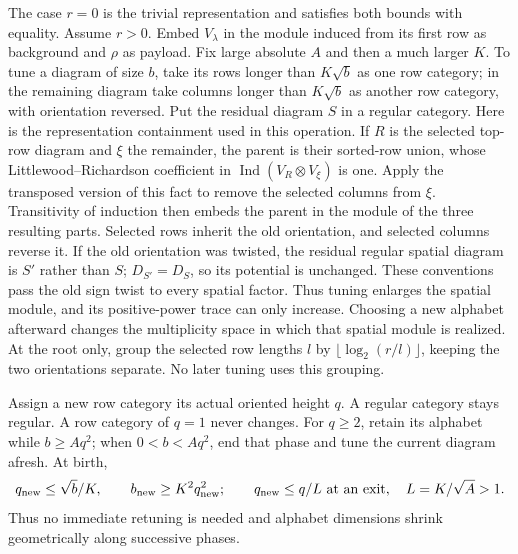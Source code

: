 The case $r=0$ is the trivial representation and satisfies both bounds
with equality.  Assume $r>0$.  Embed $V_\lambda$ in the module induced from its first row as
background and $\rho$ as payload.  Fix large absolute $A$ and then
a much larger $K$.  To tune a diagram of size $b$, take its rows
longer than $K\sqrt b$ as one row category; in the remaining diagram
take columns longer than $K\sqrt b$ as another row category, with
orientation reversed.  Put the residual diagram $S$ in a regular category.  Here is
the representation containment used in this operation.  If $R$ is the
selected top-row diagram and $\xi$ the remainder, the parent is their
sorted-row union, whose Littlewood--Richardson coefficient in
$\operatorname{Ind}(V_R\otimes V_\xi)$ is one.  Apply the transposed
version of this fact to remove the selected columns from $\xi$.
Transitivity of induction then embeds the parent in the module of
the three resulting parts.  Selected rows inherit the old orientation,
and selected columns reverse it.  If the old orientation was twisted,
the residual regular spatial diagram is $S'$ rather than $S$;
$D_{S'}=D_S$, so its potential is unchanged.  These conventions pass
the old sign twist to every spatial factor.  Thus tuning enlarges the
spatial module, and its positive-power trace can only increase.
Choosing a new alphabet afterward changes the multiplicity space in
which that spatial module is realized.
At the root only, group the selected row lengths $l$ by
$\lfloor\log_2(r/l)\rfloor$, keeping the two orientations separate.
No later tuning uses this grouping.

Assign a new row category its actual oriented height $q$.  A regular
category stays regular.  A row category of $q=1$ never changes.
For $q\ge2$, retain its alphabet while $b\ge Aq^2$; when
$0<b<Aq^2$, end that phase and tune the current diagram afresh.
At birth,
\begin{equation}\label{rec:alphabet-birth-exit}
 q_{\rm new}\le\sqrt b/K,\qquad
 b_{\rm new}\ge K^2q_{\rm new}^2;\qquad
 q_{\rm new}\le q/L\ \text{at an exit},\quad L=K/\sqrt A>1.
\end{equation}
Thus no immediate retuning is needed and alphabet dimensions shrink
geometrically along successive phases.


